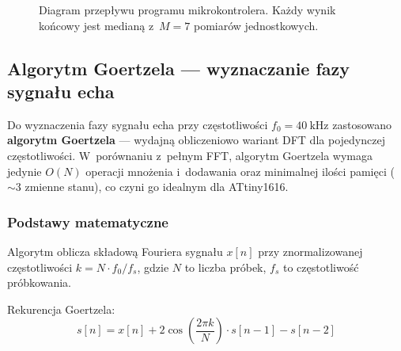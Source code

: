 \documentclass[a4paper,11pt]{article}
\begin{document}
\begin{figure}[H]
    \caption{Diagram przepływu programu mikrokontrolera. Każdy wynik końcowy
    jest medianą z~$M = 7$ pomiarów jednostkowych.}
    \label{fig:flowchart}
\end{figure}

\subsection{Algorytm Goertzela --- wyznaczanie fazy sygnału echa}
\label{sec:goertzel}

Do wyznaczenia fazy sygnału echa przy częstotliwości $f_0 = \SI{40}{\kilo\hertz}$
zastosowano \textbf{algorytm Goertzela} --- wydajną obliczeniowo wariant DFT
dla pojedynczej częstotliwości. W~porównaniu z~pełnym FFT, algorytm Goertzela
wymaga jedynie $O(N)$ operacji mnożenia i~dodawania oraz minimalnej ilości
pamięci (${\sim}3$ zmienne stanu), co czyni go idealnym dla ATtiny1616.

\subsubsection{Podstawy matematyczne}

Algorytm oblicza składową Fouriera sygnału $x[n]$ przy znormalizowanej
częstotliwości $k = N \cdot f_0 / f_s$, gdzie $N$ to liczba próbek,
$f_s$ to częstotliwość próbkowania.

Rekurencja Goertzela:
\begin{equation}
    s[n] = x[n] + 2\cos\!\left(\frac{2\pi k}{N}\right) \cdot s[n-1] - s[n-2]
    \label{eq:goertzel_recur}
\end{equation}
\end{document}
